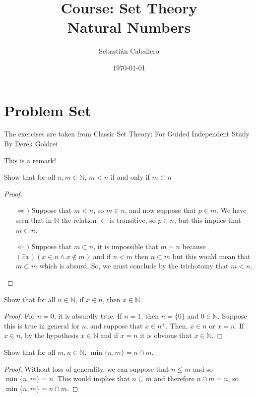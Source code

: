 \documentclass{tufte-handout}
\title{Course: Set Theory \\ \Large Natural Numbers}
\author{Sebastián Caballero}
\date{\today}
\begin{document}
\maketitle

\part{Problem Set}
The exercises are taken from Classic Set Theory: For Guided Independent Study By Derek Goldrei

\begin{remark}
	This is a remark!
\end{remark}

\begin{problem}
Show that for all $n, m \in \mathbb{N}$, $m < n$ if and only if $m \subset n$
\end{problem}
\begin{proof}
	\begin{itemize}
		\item[$\Rightarrow)$] Suppose that $m < n$, so $m \in n$, and now suppose that $p \in m$. We have seen that in $\mathbb{N}$ the relation $\in$ is transitive, so $p \in n$, but this implies that $m \subset n$.
		\item[$\Leftarrow)$] Suppose that $m \subset n$, it is impossible that $m = n$ because $(\exists x)(x \in n \wedge x \not \in m)$ and if $n < m$ then $n \subset m$ but this would mean that $m \subset m$ which is absurd. So, we must conclude by the trichotomy that $m < n$.  
	\end{itemize}
\end{proof}

\begin{problem}
	Show that for all $n \in \mathbb{N}$, if $x \in n$, then $x \in \mathbb{N}$.
\end{problem}
\begin{proof}
	For $n = 0$, it is absurdly true. If $n = 1$, then $n = \{0\}$ and $0 \in \mathbb{N}$. Suppose this is true in general for $n$, and suppose that $x \in n^+$. Then, $x \in n$ or $x = n$. If $x \in n$, by the hypothesis $x \in \mathbb{N}$ and if $x = n$ it is obvious that $x \in \mathbb{N}$.
\end{proof}

\begin{problem}
	Show that for all $m, n \in \mathbb{N}$, $\min\{n, m\}= n \cap m$.
\end{problem}
\begin{proof}
	Without loss of generality, we can suppose that $n \le m$ and so $\min\{n, m\} = n$. This would implies that $n \subseteq m$ and therefore $n \cap m = n$, so $\min\{n, m\} = n \cap m$.
\end{proof}
\end{document}
